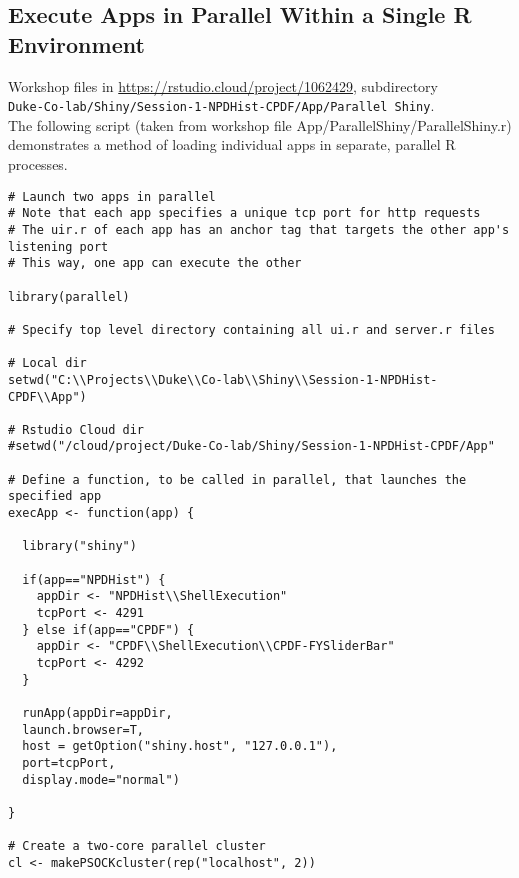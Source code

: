 \documentclass[10pt, letterpaper]{article}
\begin{document}
\begin{spacing}{1.0}
\subsection{Execute Apps in Parallel Within a Single R Environment}\label{sec:navparproc}

Workshop files in \url{https://rstudio.cloud/project/1062429}, subdirectory \\ \texttt{Duke-Co-lab/Shiny/Session-1-NPDHist-CPDF/App/Parallel Shiny}.\\

The following script (taken from workshop file App/ParallelShiny/ParallelShiny.r) demonstrates a method of loading individual apps in separate, parallel R processes.

\scriptsize
\begin{verbatim}
# Launch two apps in parallel
# Note that each app specifies a unique tcp port for http requests
# The uir.r of each app has an anchor tag that targets the other app's listening port
# This way, one app can execute the other

library(parallel)

# Specify top level directory containing all ui.r and server.r files

# Local dir
setwd("C:\\Projects\\Duke\\Co-lab\\Shiny\\Session-1-NPDHist-CPDF\\App")

# Rstudio Cloud dir
#setwd("/cloud/project/Duke-Co-lab/Shiny/Session-1-NPDHist-CPDF/App"

# Define a function, to be called in parallel, that launches the specified app
execApp <- function(app) {

  library("shiny")

  if(app=="NPDHist") {
    appDir <- "NPDHist\\ShellExecution"
    tcpPort <- 4291
  } else if(app=="CPDF") {
    appDir <- "CPDF\\ShellExecution\\CPDF-FYSliderBar"
    tcpPort <- 4292
  }

  runApp(appDir=appDir,
  launch.browser=T,
  host = getOption("shiny.host", "127.0.0.1"),
  port=tcpPort,
  display.mode="normal")

}

# Create a two-core parallel cluster
cl <- makePSOCKcluster(rep("localhost", 2))


\end{verbatim}
\end{spacing}
\end{document}
